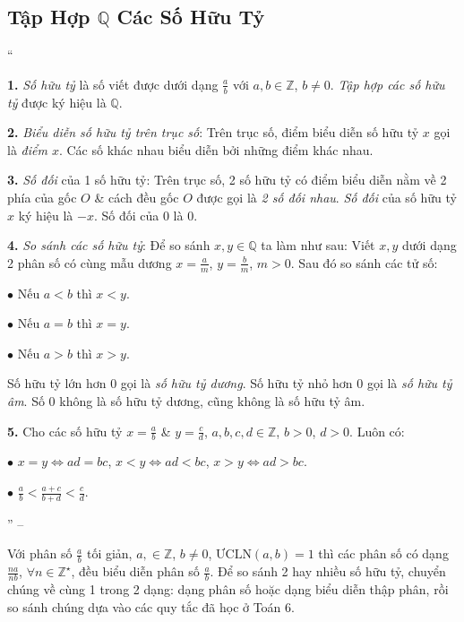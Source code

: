 \documentclass{article}
\numberwithin{equation}{section}
\begin{document}
\subsection{Tập Hợp $\mathbb{Q}$ Các Số Hữu Tỷ}
``\begin{enumerate*}
	\item[\textbf{1.}] \textit{Số hữu tỷ} là số viết được dưới dạng $\frac{a}{b}$ với $a,b\in\mathbb{Z}$, $b\ne 0$. \textit{Tập hợp các số hữu tỷ} được ký hiệu là $\mathbb{Q}$.
	\item[\textbf{2.}] \textit{Biểu diễn số hữu tỷ trên trục số}: Trên trục số, điểm biểu diễn số hữu tỷ $x$ gọi là \textit{điểm $x$}. Các số khác nhau biểu diễn bởi những điểm khác nhau.
	\item[\textbf{3.}] \textit{Số đối} của 1 số hữu tỷ: Trên trục số, 2 số hữu tỷ có điểm biểu diễn nằm về 2 phía của gốc $O$ \& cách đều gốc $O$ được gọi là \textit{2 số đối nhau}. \textit{Số đối} của số hữu tỷ $x$ ký hiệu là $-x$. Số đối của $0$ là $0$.
	\item[\textbf{4.}] \textit{So sánh các số hữu tỷ}: Để so sánh $x,y\in\mathbb{Q}$ ta làm như sau: Viết $x,y$ dưới dạng 2 phân số có cùng mẫu dương $x = \frac{a}{m}$, $y = \frac{b}{m}$, $m > 0$. Sau đó so sánh các tử số:
	\begin{enumerate*}
		\item[$\bullet$] Nếu $a < b$ thì $x < y$.
		\item[$\bullet$] Nếu $a = b$ thì $x = y$.
		\item[$\bullet$] Nếu $a > b$ thì $x > y$.
	\end{enumerate*}
	Số hữu tỷ lớn hơn $0$ gọi là \textit{số hữu tỷ dương}. Số hữu tỷ nhỏ hơn $0$ gọi là \textit{số hữu tỷ âm}. Số $0$ không là số hữu tỷ dương, cũng không là số hữu tỷ âm.
	\item[\textbf{5.}] Cho các số hữu tỷ $x = \frac{a}{b}$ \& $y = \frac{c}{d}$, $a,b,c,d\in\mathbb{Z}$, $b > 0$, $d > 0$. Luôn có:
	\begin{enumerate*}
		\item[$\bullet$] $x = y\Leftrightarrow ad = bc$, $x < y\Leftrightarrow ad < bc$, $x > y\Leftrightarrow ad > bc$.
		\item[$\bullet$] $\frac{a}{b} < \frac{a + c}{b + d} < \frac{c}{d}$.
	\end{enumerate*}'' -- \cite[\S1, pp. 4--5]{Tuyen_Toan_7}
\end{enumerate*}

Với phân số $\frac{a}{b}$ tối giản, $a,\in\mathbb{Z}$, $b\ne 0$, $\mbox{ƯCLN}(a,b) = 1$ thì các phân số có dạng $\frac{na}{nb}$, $\forall n\in\mathbb{Z}^\star$, đều biểu diễn phân số $\frac{a}{b}$. Để so sánh 2 hay nhiều số hữu tỷ, chuyển chúng về cùng 1 trong 2 dạng: dạng phân số hoặc dạng biểu diễn thập phân, rồi so sánh chúng dựa vào các quy tắc đã học ở Toán 6.
\end{document}
